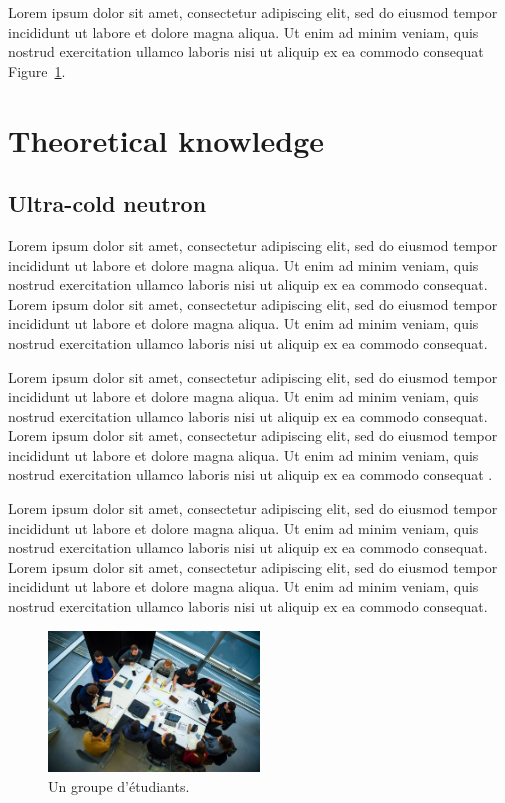 \documentclass[a4paper]{book}
\begin{document}
Lorem ipsum dolor sit amet, consectetur adipiscing elit, sed do eiusmod tempor
incididunt ut labore et dolore magna aliqua. Ut enim ad minim veniam, quis
nostrud exercitation ullamco laboris nisi ut aliquip ex ea commodo consequat
Figure~\ref{fig:stepdiagram}.


\section{Theoretical knowledge}

\subsection{Ultra-cold neutron}

Lorem ipsum dolor sit amet, consectetur adipiscing elit, sed do eiusmod tempor
incididunt ut labore et dolore magna aliqua. Ut enim ad minim veniam, quis
nostrud exercitation ullamco laboris nisi ut aliquip ex ea commodo consequat.
Lorem ipsum dolor sit amet, consectetur adipiscing elit, sed do eiusmod tempor
incididunt ut labore et dolore magna aliqua. Ut enim ad minim veniam, quis
nostrud exercitation ullamco laboris nisi ut aliquip ex ea commodo consequat.

Lorem ipsum dolor sit amet, consectetur adipiscing elit, sed do eiusmod tempor
incididunt ut labore et dolore magna aliqua. Ut enim ad minim veniam, quis
nostrud exercitation ullamco laboris nisi ut aliquip ex ea commodo consequat.
Lorem ipsum dolor sit amet, consectetur adipiscing elit, sed do eiusmod tempor
incididunt ut labore et dolore magna aliqua. Ut enim ad minim veniam, quis
nostrud exercitation ullamco laboris nisi ut aliquip ex ea commodo consequat
\cite{neutronLifeTime}.

Lorem ipsum dolor sit amet, consectetur adipiscing elit, sed do eiusmod tempor
incididunt ut labore et dolore magna aliqua. Ut enim ad minim veniam, quis
nostrud exercitation ullamco laboris nisi ut aliquip ex ea commodo consequat.
Lorem ipsum dolor sit amet, consectetur adipiscing elit, sed do eiusmod tempor
incididunt ut labore et dolore magna aliqua. Ut enim ad minim veniam, quis
nostrud exercitation ullamco laboris nisi ut aliquip ex ea commodo consequat.

\begin{figure}[ht]
  \center
  \includegraphics[width=0.5\textwidth]{pictures/GroupeEtudiants.png}
  \caption{Un groupe d'étudiants.}
  \label{fig:stepdiagram}
\end{figure}
\end{document}
